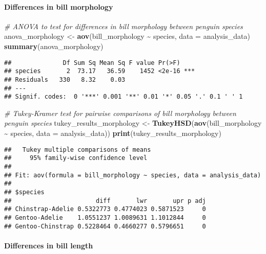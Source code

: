 \documentclass[
]{article}
\newenvironment{Shaded}{\begin{snugshade}}{\end{snugshade}}
\newcommand{\AttributeTok}[1]{\textcolor[rgb]{0.13,0.29,0.53}{#1}}
\newcommand{\CommentTok}[1]{\textcolor[rgb]{0.56,0.35,0.01}{\textit{#1}}}
\newcommand{\FunctionTok}[1]{\textcolor[rgb]{0.13,0.29,0.53}{\textbf{#1}}}
\newcommand{\NormalTok}[1]{#1}
\newcommand{\OtherTok}[1]{\textcolor[rgb]{0.56,0.35,0.01}{#1}}
\newcommand{\SpecialCharTok}[1]{\textcolor[rgb]{0.81,0.36,0.00}{\textbf{#1}}}
\begin{document}
\paragraph{Differences in bill
morphology}\label{differences-in-bill-morphology}

\begin{Shaded}
\begin{Highlighting}[]
\CommentTok{\# ANOVA to test for differences in bill morphology between penguin species}
\NormalTok{anova\_morphology }\OtherTok{\textless{}{-}} \FunctionTok{aov}\NormalTok{(bill\_morphology }\SpecialCharTok{\textasciitilde{}}\NormalTok{ species, }\AttributeTok{data =}\NormalTok{ analysis\_data)}
\FunctionTok{summary}\NormalTok{(anova\_morphology)}
\end{Highlighting}
\end{Shaded}

\begin{verbatim}
##              Df Sum Sq Mean Sq F value Pr(>F)    
## species       2  73.17   36.59    1452 <2e-16 ***
## Residuals   330   8.32    0.03                   
## ---
## Signif. codes:  0 '***' 0.001 '**' 0.01 '*' 0.05 '.' 0.1 ' ' 1
\end{verbatim}

\begin{Shaded}
\begin{Highlighting}[]
\CommentTok{\# Tukey{-}Kramer test for pairwise comparisons of bill morphology between penguin species}
\NormalTok{tukey\_results\_morphology }\OtherTok{\textless{}{-}} \FunctionTok{TukeyHSD}\NormalTok{(}\FunctionTok{aov}\NormalTok{(bill\_morphology }\SpecialCharTok{\textasciitilde{}}\NormalTok{ species, }\AttributeTok{data =}\NormalTok{ analysis\_data))}
\FunctionTok{print}\NormalTok{(tukey\_results\_morphology)}
\end{Highlighting}
\end{Shaded}

\begin{verbatim}
##   Tukey multiple comparisons of means
##     95% family-wise confidence level
## 
## Fit: aov(formula = bill_morphology ~ species, data = analysis_data)
## 
## $species
##                       diff       lwr       upr p adj
## Chinstrap-Adelie 0.5322773 0.4774023 0.5871523     0
## Gentoo-Adelie    1.0551237 1.0089631 1.1012844     0
## Gentoo-Chinstrap 0.5228464 0.4660277 0.5796651     0
\end{verbatim}

\paragraph{Differences in bill length}\label{differences-in-bill-length}
\end{document}
